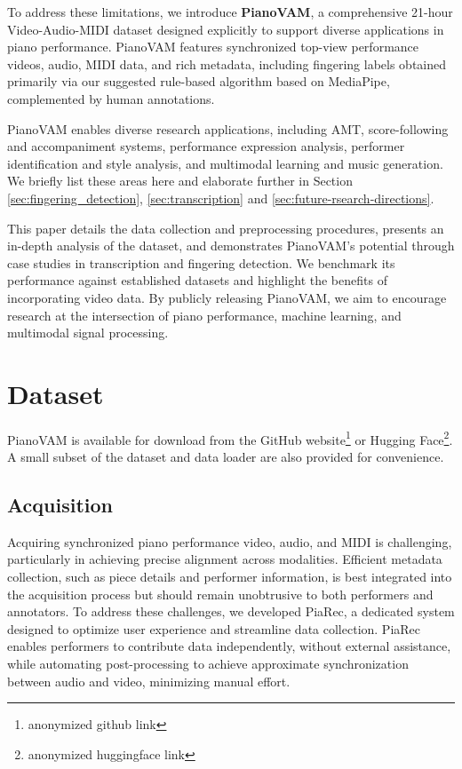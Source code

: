 \documentclass{article}
\begin{document}
To address these limitations, we introduce \textbf{PianoVAM}, a comprehensive 21-hour Video-Audio-MIDI dataset designed explicitly to support diverse applications in piano performance. PianoVAM features synchronized top-view performance videos, audio, MIDI data, and rich metadata, including fingering labels obtained primarily via our suggested rule-based algorithm based on MediaPipe, complemented by human annotations.

PianoVAM enables diverse research applications, including AMT, score-following and accompaniment systems, performance expression analysis, performer identification and style analysis, and multimodal learning and music generation. We briefly list these areas here and elaborate further in Section 
\ref{sec:fingering_detection}, \ref{sec:transcription} and
\ref{sec:future-rsearch-directions}.

This paper details the data collection and preprocessing procedures, presents an in-depth analysis of the dataset, and demonstrates PianoVAM's potential through case studies in transcription and fingering detection. We benchmark its performance against established datasets and highlight the benefits of incorporating video data. By publicly releasing PianoVAM, we aim to encourage research at the intersection of piano performance, machine learning, and multimodal signal processing.

\section{Dataset}\label{sec:dataset}
PianoVAM is available for download from the GitHub website\footnote{anonymized github link\label{github-link}} or Hugging Face\footnote{anonymized huggingface link}. A small subset of the dataset and data loader are also provided for convenience.


\subsection{Acquisition}
Acquiring synchronized piano performance video, audio, and MIDI is challenging, particularly in achieving precise alignment across modalities. Efficient metadata collection, such as piece details and performer information, is best integrated into the acquisition process but should remain unobtrusive to both performers and annotators. To address these challenges, we developed PiaRec, a dedicated system designed to optimize user experience and streamline data collection. PiaRec enables performers to contribute data independently, without external assistance, while automating post-processing to achieve approximate synchronization between audio and video, minimizing manual effort.
\end{document}
